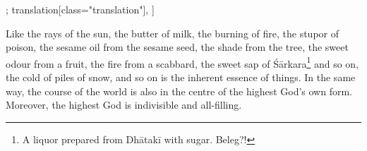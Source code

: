 \begin{alignment}[
  texts=edition[class="edition"];
  translation[class="translation"],
  ]
\begin{translation}
\begin{tlate}[p22_03]
  Like the rays of the sun, the butter of milk, the burning of fire, the stupor of poison, the sesame oil from the sesame seed, the shade from the tree, the sweet odour from a fruit, the fire from a scabbard, the sweet sap of Śārkara\footnote{A liquor prepared from Dhātakī with sugar. Beleg?!} and so on, the cold of piles of snow, and so on is the inherent essence of things. In the same way, the course of the world is also in the centre of the highest God's own form. Moreover, the highest God is indivisible and all-filling.
   \flushpage 
    \end{tlate}
  \end{translation}
\end{alignment}
\pagebreak %
